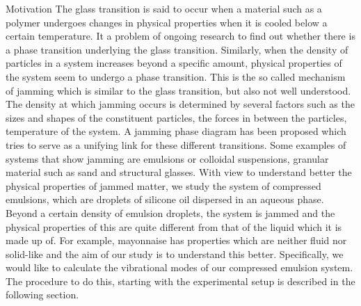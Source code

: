 \documentclass[12pt]{article}
\begin{document}
\begin{section}{Motivation}
The glass transition is said to occur when a material such as a polymer undergoes changes in physical properties when it is cooled below a certain temperature. It a problem of ongoing research to find out whether there is a phase transition underlying the glass transition. Similarly, when the density of particles in a system increases beyond a specific amount, physical properties of the system seem to undergo a phase transition. This is the so called mechanism of jamming which is similar to the glass transition, but also not well understood. The density at which jamming occurs is determined by several factors such as the sizes and shapes of the constituent particles, the forces in between the particles, temperature of the system. A jamming phase diagram has been proposed which tries to serve as a unifying link for these different transitions.\cite{liu1998nonlinear} \newline \newline
Some examples of systems that show jamming are emulsions or colloidal suspensions, granular material such as sand and structural glasses. With view to understand better the physical properties of jammed matter, we study the system of compressed emulsions, which are droplets of silicone oil dispersed in an aqueous phase. Beyond a certain density of emulsion droplets, the system is jammed and the physical properties of this are quite different from that of the liquid which it is made up of. For example, mayonnaise has properties which are neither fluid nor solid-like and the aim of our study is to understand this better. Specifically, we would like to calculate the vibrational modes of our compressed emulsion system. The procedure to do this, starting with the experimental setup is described in the following section.
\end{section}
\end{document}
